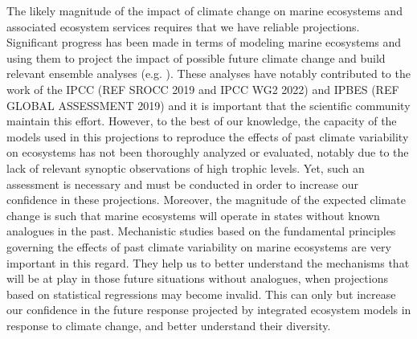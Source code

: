 The likely magnitude of the impact of climate change on marine ecosystems and associated ecosystem services requires that we have reliable projections. Significant progress has been made in terms of modeling marine ecosystems and using them to project the impact of possible future climate change and build relevant ensemble analyses (e.g. \citealp{lotzeGlobalEnsembleProjections2019, tittensorNextgenerationEnsembleProjections2021}). These analyses have notably contributed to the work of the IPCC (REF SROCC 2019 and IPCC WG2 2022) and IPBES (REF GLOBAL ASSESSMENT 2019) and it is important that the scientific community maintain this effort. However, to the best of our knowledge, the capacity of the models used in this projections to reproduce the effects of past climate variability on ecosystems has not been thoroughly analyzed or evaluated, notably due to the lack of relevant synoptic observations of high trophic levels. Yet, such an assessment is necessary and must be conducted in order to increase our confidence in these projections.
Moreover, the magnitude of the expected climate change is such that marine ecosystems will operate in states without known analogues in the past. Mechanistic studies based on the fundamental principles governing the effects of past climate variability on marine ecosystems are very important in this regard. They help us to better understand the mechanisms that will be at play in those future situations without analogues, when projections based on statistical regressions may become invalid. This can only but increase our confidence in the future response projected by integrated ecosystem models in response to climate change, and better understand their diversity.